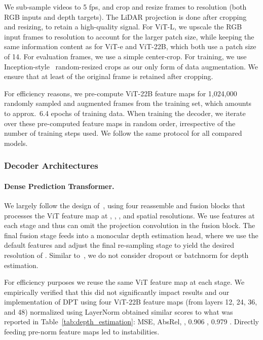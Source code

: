 \documentclass{article}
\begin{document}
We sub-sample videos to 5 fps, and crop and resize frames to  resolution (both RGB inputs and depth targets). The LiDAR projection is done after cropping and resizing, to retain a high-quality signal. For ViT-L, we upscale the RGB input frames to  resolution to account for the larger patch size, while keeping the same information content as for ViT-e and ViT-22B, which both use a patch size of 14. For evaluation frames, we use a simple center-crop. For training, we use Inception-style~\citep{szegedy2015going} random-resized crops as our only form of data augmentation. We ensure that at least  of the original frame is retained after cropping.

For efficiency reasons, we pre-compute ViT-22B feature maps for 1,024,000 randomly sampled and augmented frames from the training set, which amounts to approx.~6.4 epochs of training data. When training the decoder, we iterate over these pre-computed feature maps in random order, irrespective of the number of training steps used. We follow the same protocol for all compared models.

\subsubsection{Decoder Architectures}

\paragraph{Dense Prediction Transformer.}

We largely follow the design of~\citep{ranftl2021vision}, using four reassemble and fusion blocks that processes the  ViT feature map at , , , and  spatial resolutions.
We use  features at each stage and thus can omit the  projection convolution in the fusion block. 
The final fusion stage feeds into a monocular depth estimation head, where we use the default  features and adjust the final re-sampling stage to yield the desired resolution of .
Similar to~\citep{ranftl2021vision}, we do not consider dropout or batchnorm for depth estimation.

For efficiency purposes we reuse the same  ViT feature map at each stage.
We empirically verified that this did not significantly impact results and our implementation of DPT using four ViT-22B feature maps (from layers 12, 24, 36, and 48) normalized using LayerNorm obtained similar scores to what was reported in Table~\ref{tab:depth_estimation}:  MSE,  AbsRel,  , 0.906 , 0.979 .
Directly feeding pre-norm feature maps led to instabilities.
\end{document}
